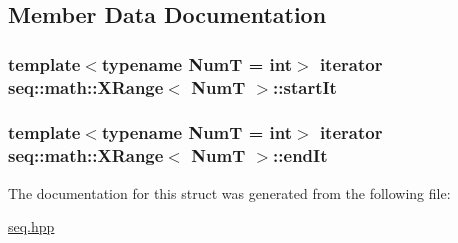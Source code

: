 \subsection{Member Data Documentation}
\hypertarget{structseq_1_1math_1_1_x_range_ab79c83388a6443fe62ad2a4162af999d}{
\subsubsection[{start\-It}]{\setlength{\rightskip}{0pt plus 5cm}template$<$typename Num\-T = int$>$ {\bf iterator} {\bf seq\-::math\-::\-X\-Range}$<$ Num\-T $>$\-::{\bf start\-It}}}\label{structseq_1_1math_1_1_x_range_ab79c83388a6443fe62ad2a4162af999d}
\hypertarget{structseq_1_1math_1_1_x_range_ad0c15c89614e21576d3f6175d9ca1009}{
\subsubsection[{end\-It}]{\setlength{\rightskip}{0pt plus 5cm}template$<$typename Num\-T = int$>$ {\bf iterator} {\bf seq\-::math\-::\-X\-Range}$<$ Num\-T $>$\-::{\bf end\-It}}}\label{structseq_1_1math_1_1_x_range_ad0c15c89614e21576d3f6175d9ca1009}


The documentation for this struct was generated from the following file\-:\begin{DoxyCompactItemize}
\item 
\hyperlink{seq_8hpp}{seq.\-hpp}\end{DoxyCompactItemize}
